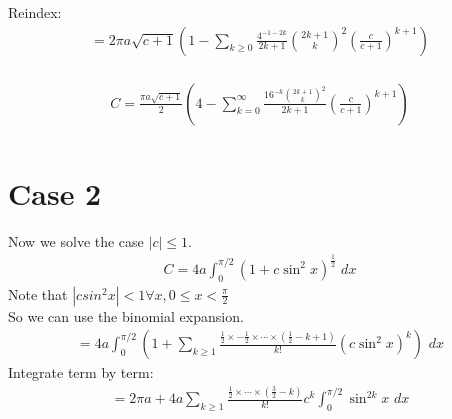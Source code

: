 \documentclass{article}
\begin{document}
Reindex:
\begin{equation*}
\begin{split}
	= 2\pi a\sqrt{c+1} \left(1 -
	\sum_{k\geq 0} \frac{4^{-1-2k}}{2k+1}{{2k+1}\choose k}^2\left(\frac{c}{c+1}\right)^{k+1}\right)\\
\end{split}
\end{equation*}

\begin{tcolorbox}
\begin{equation*}
\begin{split}
	C = \frac{\pi a\sqrt{c+1}}{2} \left(4 -
	\sum_{k=0}^{\infty} \frac{16^{-k}{{2k+1}\choose k}^2}{2k+1}\left(\frac{c}{c+1}\right)^{k+1}\right)\\
\end{split}
\end{equation*}
\end{tcolorbox}



\section{Case 2}
Now we solve the case $|c| \leq 1$.
\begin{equation*}
\begin{split}
	C = 4a\int_{0}^{\pi/2}(1 + c\sin^2x)^\frac{1}{2}\,\,dx
\end{split}
\end{equation*}
Note that $|csin^2x|<1\forall x, 0\leq x < \frac{\pi}{2}$\\
So we can use the binomial expansion.
\begin{equation*}
\begin{split}
	= 4a\int_{0}^{\pi/2}\left(1 + \sum_{k\geq 1}\frac{\frac{1}{2}\times-\frac{1}{2}\times\cdots\times(\frac{1}{2}-k+1)}{k!}(c\sin^2x)^k\right)\,\,dx
\end{split}
\end{equation*}
Integrate term by term:
\begin{equation}
\begin{split}
	= 2\pi a + 4a\sum_{k\geq 1}\frac{\frac{1}{2}\times\cdots\times(\frac{3}{2}-k)}{k!}c^k\int_{0}^{\pi/2}\sin^{2k}x\,\,dx\\
\end{split}
\end{equation}
\end{document}
